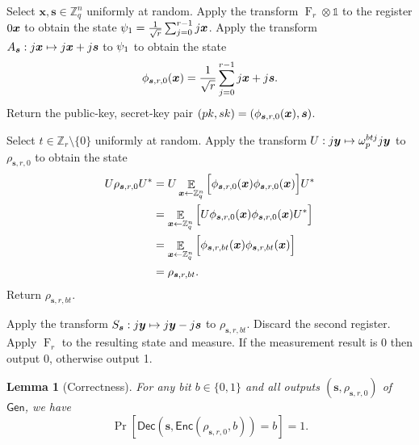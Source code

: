\documentclass[11pt]{article}
\theoremstyle{plain}
\newtheorem{lemma}[theorem]{Lemma}
\theoremstyle{definition}
\DeclareMathOperator{\qft}{F}
\DeclareMathOperator{\E}{\mathbb{E}}
\let\ket\relax
\DeclarePairedDelimiter{\ket}{\lvert}{\rangle}
\let\bra\relax
\DeclarePairedDelimiter{\bra}{\langle}{\rvert}
\def\Z{\mathbb{Z}}
\def\gen{\mathsf{Gen}}
\def\enc{\mathsf{Enc}}
\def\dec{\mathsf{Dec}}
\begin{document}
\begin{description}[leftmargin = *]
\item [$\gen(1^n)$:] Select $\bm{x}, \bm{s} \in \Z_q^n$ uniformly at random. Apply the transform $\qft_r \otimes \mathds{1}$ to the register $\ket{0} \ket{\bm{x}}$ to obtain the state $\ket{\psi_1} = \frac{1}{\sqrt{r}} \sum_{j = 0}^{r - 1} \ket{j} \ket{\bm{x}}$. Apply the transform $A_{\bm{s}}: \ket{j}\ket{\bm{x}} \mapsto \ket{j}\ket{\bm{x} + j\bm{s}}$ to $\ket{\psi_1}$ to obtain the state
\[ \ket{\phi_{\bm{s}, r, 0}(\bm{x})} = \frac{1}{\sqrt{r}} \sum_{j = 0}^{r - 1} \ket{j} \ket{\bm{x} + j\bm{s}}. \]
Return the public-key, secret-key pair $(pk, sk) = (\ket{\phi_{\bm{s}, r, 0}(\bm{x})}, \bm{s})$. 

\item [$\enc(pk = \rho_{\bm{s}, r, 0}, b \in \{ 0, 1 \})$:]  Select $t \in \Z_r {\setminus} \{0\}$ uniformly at random. Apply the transform $U: \ket{j}\ket{\bm{y}} \mapsto \omega_p^{btj}\ket{j}\ket{\bm{y}}$ to $\rho_{\bm{s}, r, 0}$ to obtain the state
\begin{align*}
    U \rho_{\bm{s}, r, 0} U^*
    & = U \E_{\bm{x} \leftarrow \Z_q^n} \Big[ \ket{\phi_{\bm{s}, r, 0}(\bm{x})} \bra{\phi_{\bm{s}, r, 0}(\bm{x})} \Big] U^* \\
    & = \E_{\bm{x} \leftarrow \Z_q^n} \Big[ U \ket{\phi_{\bm{s}, r, 0}(\bm{x})} \bra{\phi_{\bm{s}, r, 0}(\bm{x})} U^* \Big] \\
    & = \E_{\bm{x} \leftarrow \Z_q^n} \Big[ \ket{\phi_{\bm{s}, r, bt}(\bm{x})} \bra{\phi_{\bm{s}, r, bt}(\bm{x})} \Big] \\
    & = \rho_{\bm{s}, r, bt}.
\end{align*}
Return $\rho_{\bm{s}, r, bt}$.

\item [$\dec(sk = \bm{s}, c = \rho_{\bm{s}, r, bt})$:]  Apply the transform $S_{\bm{s}}: \ket{j}\ket{\bm{y}} \mapsto \ket{j}\ket{\bm{y} - j\bm{s}}$ to $\rho_{\bm{s}, r, bt}$. Discard the second register. Apply $\qft_r$ to the resulting state and measure. If the measurement result is 0 then output 0, otherwise output 1. 

\end{description}
\begin{lemma}[Correctness]
    For any bit $b \in \{ 0, 1 \}$ and all outputs $(\bm{s}, \rho_{\bm{s}, r, 0})$ of $\gen$, we have
    \[ \Pr [ \dec(\bm{s}, \enc(\rho_{\bm{s}, r, 0}, b)) = b ] = 1. \]
\end{lemma}
\end{document}
